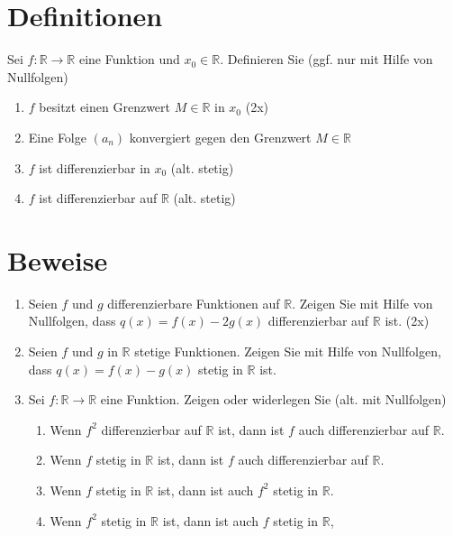 \documentclass{article}
\begin{document}
\section*{Definitionen}

Sei $f: \mathbb{R} \to \mathbb{R}$ eine Funktion und $x_0 \in \mathbb{R}$. Definieren Sie (ggf. nur mit Hilfe von Nullfolgen)
\begin{enumerate}
    \item $f$ besitzt einen Grenzwert $M \in \mathbb{R}$ in $x_0$ (2x)
    \item Eine Folge $(a_n)$ konvergiert gegen den Grenzwert $M \in \mathbb{R}$
    \item $f$ ist differenzierbar in $x_0$ (alt. stetig)
    \item $f$ ist differenzierbar auf $\mathbb{R}$ (alt. stetig)
\end{enumerate}

\section*{Beweise}

\begin{enumerate}[label=(\arabic*)]
    \item Seien $f$ und $g$ differenzierbare Funktionen auf $\mathbb{R}$. Zeigen Sie mit Hilfe von Nullfolgen, dass $q(x) = f(x) - 2g(x)$ differenzierbar auf $\mathbb{R}$ ist. (2x)

    \item Seien $f$ und $g$ in $\mathbb{R}$ stetige Funktionen. Zeigen Sie mit Hilfe von Nullfolgen, dass $q(x) = f(x) - g(x)$ stetig in $\mathbb{R}$ ist.

    \item Sei $f : \mathbb{R} \to \mathbb{R}$ eine Funktion. Zeigen oder widerlegen Sie (alt. mit Nullfolgen)
    \begin{enumerate}
        \item Wenn $f^2$ differenzierbar auf $\mathbb{R}$ ist, dann ist $f$ auch differenzierbar auf $\mathbb{R}$.
        \item Wenn $f$ stetig in $\mathbb{R}$ ist, dann ist $f$ auch differenzierbar auf $\mathbb{R}$.
        \item Wenn $f$ stetig in $\mathbb{R}$ ist, dann ist auch $f^2$ stetig in $\mathbb{R}$.
        \item Wenn $f^2$ stetig in $\mathbb{R}$ ist, dann ist auch $f$ stetig in $\mathbb{R}$,
    \end{enumerate}
\end{enumerate}
\end{document}
